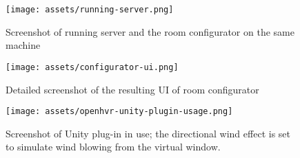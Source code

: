 \begin{figure}[h]{}
\centering\texttt{[image: assets/running-server.png]}
\caption{Screenshot of running server and the room configurator on the same machine}
\end{figure}

\begin{figure}[h]{}
\centering\texttt{[image: assets/configurator-ui.png]}
\caption{Detailed screenshot of the resulting UI of room configurator}
\end{figure}

\begin{figure}[h]{}
\centering\texttt{[image: assets/openhvr-unity-plugin-usage.png]}
\caption{Screenshot of Unity plug-in in use; the directional wind effect is set to simulate wind blowing from the virtual window.}
\end{figure}
